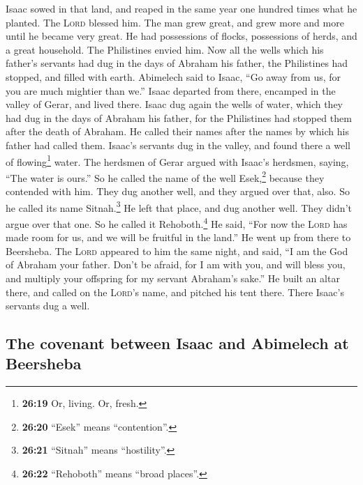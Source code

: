  Isaac sowed in that land, and reaped in the same year
one hundred times what he planted. The \textsc{Lord} blessed him.
 The man grew great, and grew more and more until he
became very great.  He had possessions of flocks,
possessions of herds, and a great household. The Philistines envied him.
 Now all the wells which his father's servants had dug in
the days of Abraham his father, the Philistines had stopped, and filled
with earth.  Abimelech said to Isaac, ``Go away from us,
for you are much mightier than we.''  Isaac departed from
there, encamped in the valley of Gerar, and lived there. 
Isaac dug again the wells of water, which they had dug in the days of
Abraham his father, for the Philistines had stopped them after the death
of Abraham. He called their names after the names by which his father
had called them.  Isaac's servants dug in the valley, and
found there a well of flowing\footnote{\textbf{26:19} Or, living. Or,
  fresh.} water.  The herdsmen of Gerar argued with
Isaac's herdsmen, saying, ``The water is ours.'' So he called the name
of the well Esek,\footnote{\textbf{26:20} ``Esek'' means ``contention''.}
because they contended with him.  They dug another well,
and they argued over that, also. So he called its name
Sitnah.\footnote{\textbf{26:21} ``Sitnah'' means ``hostility''.}
 He left that place, and dug another well. They didn't
argue over that one. So he called it Rehoboth.\footnote{\textbf{26:22}
  ``Rehoboth'' means ``broad places''.} He said, ``For now the
\textsc{Lord} has made room for us, and we will be fruitful in the
land.''  He went up from there to Beersheba.
 The \textsc{Lord} appeared to him the same night, and
said, ``I am the God of Abraham your father. Don't be afraid, for I am
with you, and will bless you, and multiply your offspring for my servant
Abraham's sake.''  He built an altar there, and called on
the \textsc{Lord}'s name, and pitched his tent there. There Isaac's
servants dug a well.

\hypertarget{the-covenant-between-isaac-and-abimelech-at-beersheba}{%
\subsection{The covenant between Isaac and Abimelech at
Beersheba}\label{the-covenant-between-isaac-and-abimelech-at-beersheba}}


